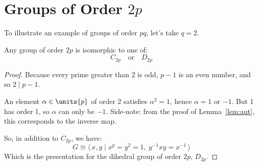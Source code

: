 \section{Groups of Order \(2p\)}
To illustrate an example of groups of order \(pq\), let's take \(q = 2\).
\begin{theorem}
    Any group of order \(2p\) is isomorphic to one of:
    \[C_{2p} \quad \text{or} \quad D_{2p}\]
\end{theorem}

\begin{proof}
Because every prime greater than 2 is odd, \(p - 1\) is an even number, and so \(2 \mid p - 1\).

An element \(\alpha \in \units{p}\) of order 2 satisfies \(\alpha^2 = 1\), hence \(\alpha = 1\) or \(-1\).
But 1 has order 1, so \(\alpha\) can only be \(-1\).
Side-note: from the proof of Lemma~\ref{lem:aut}, this corresponds to the inverse map.

So, in addition to \(C_{2p}\), we have:
\[G \cong \langle\, x, y \mid x^p = y^2 = 1,\ y^{-1}xy = x^{-1}\,\rangle\]
Which is the presentation for the dihedral group of order \(2p\), \(D_{2p}\).
\end{proof}
